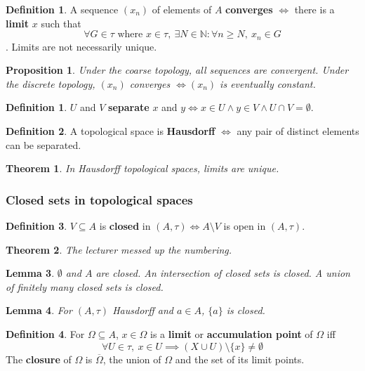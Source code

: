 \documentclass[12pt]{article}
\newtheorem{thm}{Theorem}[section]
\newtheorem{lem}[thm]{Lemma}
\newtheorem*{prop*}{Proposition}
\theoremstyle{definition}
\newtheorem{defn}{Definition}[section]
\newtheorem*{defn*}{Definition}
\begin{document}
\begin{defn}
	A sequence $(x_n)$ of elements of $A$ \textbf{converges} $\iff$ there is a \textbf{limit} $x$ such that
	$$\forall G \in \tau \text{ where } x \in \tau,\ \exists N \in \mathbb{N} : \forall n \geq N,\ x_n \in G$$.
	Limits are not necessarily unique.
\end{defn}

\begin{prop*}
	Under the coarse topology, all sequences are convergent.
	Under the discrete topology, $(x_n)$ converges $\iff (x_n)$ is eventually constant.
\end{prop*}

\begin{defn*}
	$U$ and $V$ \textbf{separate} $x$ and $y \iff x \in U \land y \in V \land U \cap V = \emptyset$.
\end{defn*}

\begin{defn}
	A topological space is \textbf{Hausdorff} $\iff$ any pair of distinct elements can be separated.
\end{defn}

\begin{thm}
	In Hausdorff topological spaces, limits are unique.
\end{thm}

\subsubsection{Closed sets in topological spaces}

\begin{defn}
	$V \subseteq A$ is \textbf{closed} in $(A, \tau) \iff A \setminus V$ is open in $(A, \tau)$.
\end{defn}

\begin{thm}
	The lecturer messed up the numbering.
\end{thm}

\begin{lem}
	$\emptyset$ and $A$ are closed.
	An intersection of closed sets is closed.
	A union of finitely many closed sets is closed.
\end{lem}

\begin{lem}
	For $(A, \tau)$ Hausdorff and $a \in A$, $\{a\}$ is closed.
\end{lem}

\begin{defn}
	For $\Omega \subseteq A$, $x \in \Omega$ is a \textbf{limit} or \textbf{accumulation point} of $\Omega$ iff 
	$$\forall U \in \tau,\ x \in U \implies (X \cup U) \setminus \{x\} \neq \emptyset$$
	The \textbf{closure} of $\Omega$ is $\overline{\Omega}$, the union of $\Omega$ and the set of its limit points.
\end{defn}
\end{document}
